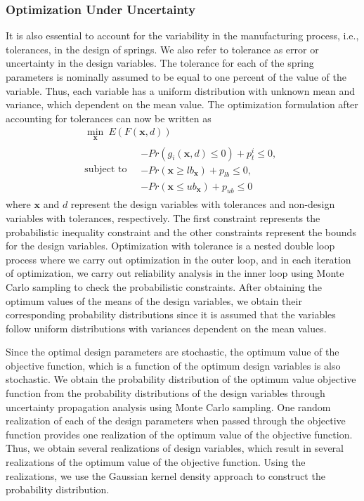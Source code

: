 \documentclass[10pt]{article}
\begin{document}
\subsubsection{Optimization Under Uncertainty} It is also essential to account for the variability in the manufacturing process, i.e., tolerances, in the design of springs. We also refer to tolerance as error or uncertainty in the design variables. The tolerance for each of the spring parameters is nominally assumed to be equal to one percent of the value of the variable. Thus, each variable has a uniform distribution with unknown mean and variance, which dependent on the mean value. The optimization formulation after accounting for tolerances can now be written as 
\begin{equation}
				\begin{gathered}
	 				\min_{\mathbf{x}} \ E(F (\mathbf{x},d)) \\
	 				\mbox{subject to} \quad 
					\begin{split}
					-Pr(g_{i}(\mathbf{x},d) \leq 0) + p_{t}^{i} \le 0, \\
					-Pr(\mathbf{x} \geq lb_{\mathbf{x}}) + p_{lb} \le 0, \\
					-Pr(\mathbf{x} \leq ub_{\mathbf{x}}) + p_{ub} \le 0
					\end{split}
				\end{gathered}
			\end{equation}
where $\mathbf{x}$ and $d$ represent the design variables with tolerances and non-design variables with tolerances, respectively. The first constraint represents the probabilistic inequality constraint and the other constraints represent the bounds for the design variables. Optimization with tolerance is a nested double loop process where we carry out optimization in the outer loop, and in each iteration of optimization, we carry out reliability analysis in the inner loop using Monte Carlo sampling to check the probabilistic constraints. After obtaining the optimum values of the means of the design variables, we obtain their corresponding probability distributions since it is assumed that the variables follow uniform distributions with variances dependent on the mean values. 

Since the optimal design parameters are stochastic, the optimum value of the objective function, which is a function of the optimum design variables is also stochastic. We obtain the probability distribution of the optimum value objective function from the probability distributions of the design variables through uncertainty propagation analysis using Monte Carlo sampling. One random realization of each of the design parameters when passed through the objective function provides one realization of the optimum value of the objective function. Thus, we obtain several realizations of design variables, which result in several realizations of the optimum value of the objective function. Using the realizations, we use the Gaussian kernel density approach to construct the probability distribution.
\end{document}
